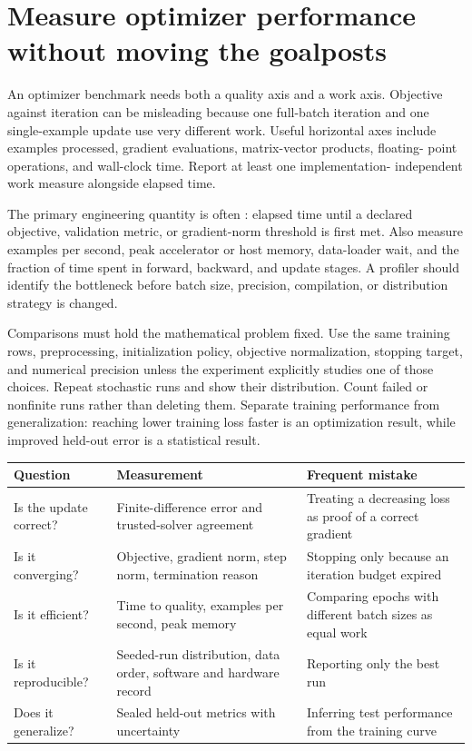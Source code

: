 \section{Measure optimizer performance without moving the goalposts}

An optimizer benchmark needs both a quality axis and a work axis. Objective
against iteration can be misleading because one full-batch iteration and one
single-example update use very different work. Useful horizontal axes include
examples processed, gradient evaluations, matrix-vector products, floating-
point operations, and wall-clock time. Report at least one implementation-
independent work measure alongside elapsed time.

The primary engineering quantity is often : elapsed time
until a declared objective, validation metric, or gradient-norm threshold is
first met. Also measure examples per second, peak accelerator or host memory,
data-loader wait, and the fraction of time spent in forward, backward, and
update stages. A profiler should identify the bottleneck before batch size,
precision, compilation, or distribution strategy is changed.

Comparisons must hold the mathematical problem fixed. Use the same training
rows, preprocessing, initialization policy, objective normalization, stopping
target, and numerical precision unless the experiment explicitly studies one
of those choices. Repeat stochastic runs and show their distribution. Count
failed or nonfinite runs rather than deleting them. Separate training
performance from generalization: reaching lower training loss faster is an
optimization result, while improved held-out error is a statistical result.

\begin{tabularx}{\textwidth}{@{}>{\raggedright\arraybackslash}p{}>{\raggedright\arraybackslash}p{}>{\raggedright\arraybackslash}X@{}}
\toprule
Question & Measurement & Frequent mistake \\
\midrule
Is the update correct? & Finite-difference error and trusted-solver agreement &
Treating a decreasing loss as proof of a correct gradient \\
Is it converging? & Objective, gradient norm, step norm, termination reason &
Stopping only because an iteration budget expired \\
Is it efficient? & Time to quality, examples per second, peak memory & Comparing
epochs with different batch sizes as equal work \\
Is it reproducible? & Seeded-run distribution, data order, software and hardware
record & Reporting only the best run \\
Does it generalize? & Sealed held-out metrics with uncertainty & Inferring test
performance from the training curve \\
\bottomrule
\end{tabularx}

